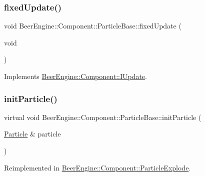 \subsubsection{\texorpdfstring{fixed\+Update()}{fixedUpdate()}}
{\footnotesize\ttfamily void Beer\+Engine\+::\+Component\+::\+Particle\+Base\+::fixed\+Update (\begin{DoxyParamCaption}\item[{void}]{ }\end{DoxyParamCaption})\hspace{0.3cm}{\ttfamily [virtual]}}



Implements \mbox{\hyperlink{class_beer_engine_1_1_component_1_1_i_update_a615c127a4729f73713e5eaeee538854b}{Beer\+Engine\+::\+Component\+::\+I\+Update}}.

\mbox{\label{class_beer_engine_1_1_component_1_1_particle_base_a8d42fe68ec7c27aed419cde949ac278a}} 
\subsubsection{\texorpdfstring{init\+Particle()}{initParticle()}}
{\footnotesize\ttfamily virtual void Beer\+Engine\+::\+Component\+::\+Particle\+Base\+::init\+Particle (\begin{DoxyParamCaption}\item[{\mbox{\hyperlink{struct_beer_engine_1_1_component_1_1_particle}{Particle}} \&}]{particle }\end{DoxyParamCaption})\hspace{0.3cm}{\ttfamily [virtual]}}



Reimplemented in \mbox{\hyperlink{class_beer_engine_1_1_component_1_1_particle_explode_abe727afab3c6a77d2b163e2c37a0f37b}{Beer\+Engine\+::\+Component\+::\+Particle\+Explode}}.

\mbox{\label{class_beer_engine_1_1_component_1_1_particle_base_ab891afa6a5b2c99ffe94691bb5419588}} 
